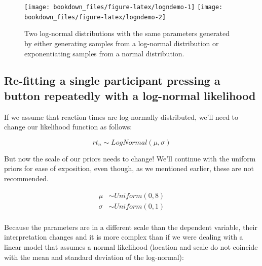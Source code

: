 \documentclass[12pt,]{krantz}
\theoremstyle{definition}
\theoremstyle{definition}
\theoremstyle{definition}
\theoremstyle{remark}
\begin{document}
\begin{figure}
\texttt{[image: bookdown\_files/figure-latex/logndemo-1]} \texttt{[image: bookdown\_files/figure-latex/logndemo-2]} \caption{Two log-normal distributions with the same parameters generated by either generating samples from a log-normal distribution or exponentiating samples from a normal distribution.}\label{fig:logndemo}
\end{figure}

\subsection{Re-fitting a single participant pressing a button repeatedly
with a log-normal likelihood}\label{sec:lognormal}

If we assume that reaction times are log-normally distributed, we'll
need to change our likelihood function as follows:

\begin{equation}
rt_n \sim LogNormal(\mu,\sigma)
\end{equation}

But now the scale of our priors needs to change! We'll continue with the
uniform priors for ease of exposition, even though, as we mentioned
earlier, these are not recommended.

\begin{equation}
\begin{aligned}
\mu &\sim Uniform(0, 8) \\
\sigma &\sim Uniform(0, 1) \\
\end{aligned}
\label{eq:logpriorsunif}
\end{equation}

Because the parameters are in a different scale than the dependent
variable, their interpretation changes and it is more complex than if we
were dealing with a linear model that assumes a normal likelihood
(location and scale do not coincide with the mean and standard deviation
of the log-normal):
\end{document}
